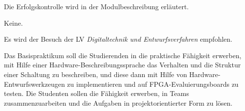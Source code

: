 \begin{course}

\setdoclanguagegerman
{}



\coursehead


\label{cour_8241.dp_997}


\begin{styleenv}
\begin{assessment}
Die Erfolgskontrolle wird in der Modulbeschreibung erläutert.


\end{assessment}

\begin{conditions}Keine.\end{conditions}

\begin{recommendations}Es wird der Besuch der LV \emph{Digitaltechnik und Entwurfsverfahren} empfohlen.

\end{recommendations}
\end{styleenv}

\begin{learningoutcomes}
Das Basispraktikum soll die Studierenden in die praktische Fähigkeit erwerben, mit Hilfe einer Hardware-Beschreibungssprache das Verhalten und die Struktur einer Schaltung zu beschreiben, und diese dann mit Hilfe von Hardware-Entwurfswerkzeugen zu implementieren und auf FPGA-Evaluierungsboards zu testen. \newline
Die Studenten sollen die Fähigkeit erwerben, in Teams zusammenzuarbeiten und die Aufgaben in projektorientierter Form zu lösen.


\end{learningoutcomes}


\end{course}
